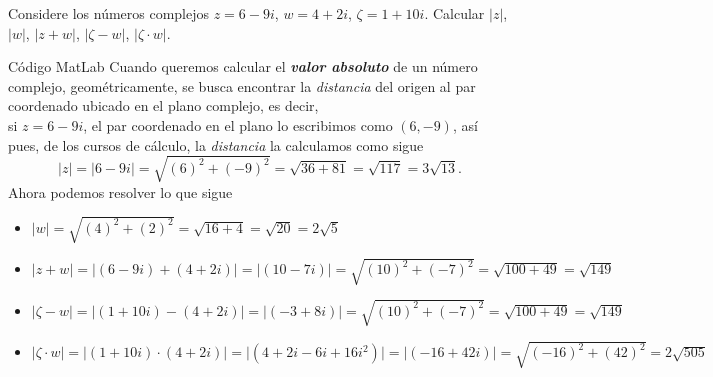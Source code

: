 \documentclass[twoside]{book}
\renewcommand{\emph}[1]{\textbf{\textit{\textcolor{amber}{#1}}}}
\begin{document}
\begin{example}{}
    Considere los n\'umeros complejos $z=6-9i$, $w=4+2i$, $\zeta=1+10i$. Calcular $ \vert z \vert$, $ \vert w \vert$, $\vert z+w \vert$, $|\zeta-w|$, $\vert \zeta \cdot w \vert$.
\end{example}
\begin{sol}
    \begin{solucion}{C\'odigo MatLab}
        Cuando queremos calcular el \emph{valor absoluto} de un número complejo, geométricamente, se busca encontrar la \textit{distancia} del origen al par coordenado ubicado en el plano complejo, es decir,\\ si $z= 6-9i$, el par coordenado en el plano lo escribimos como $(6,-9)$, así pues, de los cursos de cálculo, la \textit{distancia} la calculamos como sigue
        $$\vert z \vert = \vert6-9i\vert = \sqrt{(6)^2+ (-9)^2} = \sqrt{36+81} = \sqrt{117}= 3\sqrt{13}.$$ Ahora podemos resolver lo que sigue
        \begin{itemize}
            \item $\vert w \vert=\sqrt{(4)^2+(2)^2}=\sqrt{16+4}= \sqrt{20}=2\sqrt{5}$
            \item $\vert z+ w\vert=\vert(6-9i)+(4+2i)\vert=\vert(10-7i)\vert=\sqrt{(10)^2+(-7)^2}=\sqrt{100+49}=\sqrt{149}$
            \item $\vert \zeta - w\vert=\vert(1+10i)-(4+2i)\vert=\vert(-3+8i)\vert=\sqrt{(10)^2+(-7)^2}=\sqrt{100+49}=\sqrt{149}$
            \item $\vert \zeta \cdot w\vert=\vert(1+10i)\cdot(4+2i)\vert=\vert(4+2i-6i+16i^2)\vert=\vert(-16+42i)\vert=\sqrt{(-16)^2+(42)^2}=2\sqrt{505}$
        \end{itemize}

    \end{solucion}
\end{sol}%
\end{document}
